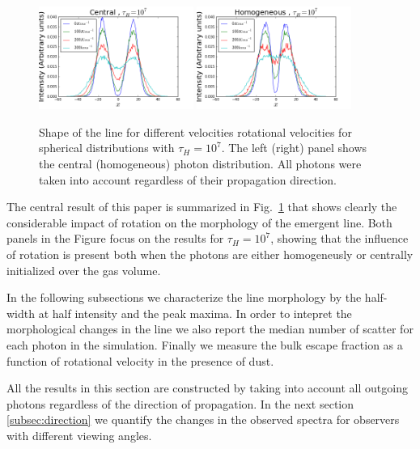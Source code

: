 \documentclass[usenatbib]{mn2e}
\newcommand{\ly}{{\ifmmode{{\rm Ly}\alpha~}\else{Ly$\alpha$~}\fi}}
\begin{document}
\begin{figure}
  \includegraphics[width=0.45\textwidth]{SpectraDifVelocitiesCentral.png}
  \includegraphics[width=0.45\textwidth]{SpectraDifVelocitiesHOM.png}
\caption{Shape of the \ly line for
    different velocities rotational velocities for spherical
    distributions with $\tau_{H}=10^{7}$. The left (right) panel shows the central
    (homogeneous) photon distribution. All photons were taken into
    account regardless of their propagation direction.
  \label{fig:differentvelocities}}
\end{figure}

The central result of this paper is summarized in
Fig.~\ref{fig:differentvelocities} that shows clearly the considerable
impact of rotation on the morphology of the emergent \ly line. Both
panels in the Figure focus on the results for $\tau_{H}=10^{7}$,
showing that the influence of rotation is present both when the
photons are either homogeneusly or centrally initialized over the gas
volume. 

In the following subsections we characterize the line morphology by
the half-width at half intensity and the peak maxima. In order to
intepret the morphological changes in the line we also report the
median number of scatter for each \ly photon in the
simulation. Finally we measure the bulk escape fraction as a function
of rotational velocity in the presence of dust.


All the results in this section are constructed by taking into
account all outgoing photons regardless of the direction of
propagation. In the next section \ref{subsec:direction} we quantify 
the changes in the observed spectra for observers with different
viewing angles. 
\end{document}
